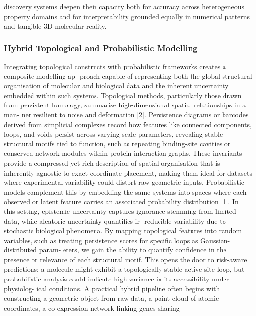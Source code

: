 \documentclass[
]{article}
\begin{document}
discovery systems deepen their capacity both for accuracy across
heterogeneous property domains and for interpretability grounded equally
in numerical patterns and tangible 3D molecular reality.

\subsubsection{Hybrid Topological and Probabilistic
Modelling}\label{hybrid-topological-and-probabilistic-modelling}

Integrating topological constructs with probabilistic frameworks creates
a composite modelling ap- proach capable of representing both the global
structural organisation of molecular and biological data and the
inherent uncertainty embedded within such systems. Topological methods,
particularly those drawn from persistent homology, summarise
high-dimensional spatial relationships in a man- ner resilient to noise
and deformation {[}\hyperref[_bookmark42]{2}{]}. Persistence diagrams or
barcodes derived from simplicial complexes record how features like
connected components, loops, and voids persist across varying scale
parameters, revealing stable structural motifs tied to function, such as
repeating binding-site cavities or conserved network modules within
protein interaction graphs. These invariants provide a compressed yet
rich description of spatial organisation that is inherently agnostic to
exact coordinate placement, making them ideal for datasets where
experimental variability could distort raw geometric inputs.
Probabilistic models complement this by embedding the same systems into
spaces where each observed or latent feature carries an associated
probability distribution {[}\hyperref[_bookmark41]{1}{]}. In this
setting, epistemic uncertainty captures ignorance stemming from limited
data, while aleatoric uncertainty quantifies ir- reducible variability
due to stochastic biological phenomena. By mapping topological features
into random variables, such as treating persistence scores for specific
loops as Gaussian-distributed param- eters, we gain the ability to
quantify confidence in the presence or relevance of each structural
motif. This opens the door to risk-aware predictions: a molecule might
exhibit a topologically stable active site loop, but probabilistic
analysis could indicate high variance in its accessibility under
physiolog- ical conditions. A practical hybrid pipeline often begins
with constructing a geometric object from raw data, a point cloud of
atomic coordinates, a co-expression network linking genes sharing
\end{document}
